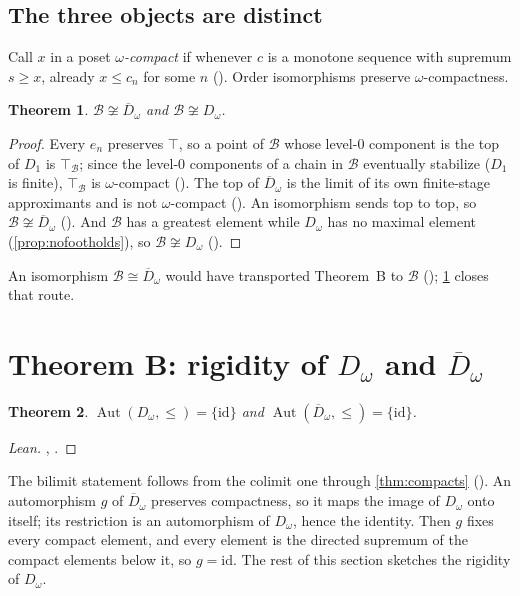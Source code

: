 \documentclass[11pt]{amsart}
\theoremstyle{plain}
\newtheorem{theorem}{Theorem}[section]
\theoremstyle{definition}
\newcommand{\Aut}{\operatorname{Aut}}
\newcommand{\Dc}{D_\omega}
\newcommand{\Db}{\overline{D}_\omega}
\newcommand{\BB}{\mathcal{B}}
\newcommand{\id}{\mathrm{id}}
\newcommand{\iso}{\cong}
\begin{document}
\subsection{The three objects are distinct}

Call $x$ in a poset \emph{$\omega$-compact} if whenever $c$ is a monotone
sequence with supremum $s\ge x$, already $x\le c_n$ for some $n$
(). Order isomorphisms preserve
$\omega$-compactness.

\begin{theorem}\label{thm:gap}
$\BB\not\iso\Db$ and $\BB\not\iso\Dc$.
\end{theorem}

\begin{proof}
Every $e_n$ preserves $\top$, so a point of $\BB$ whose level-$0$ component is
the top of $D_1$ is $\top_\BB$; since the level-$0$ components of a chain in
$\BB$ eventually stabilize ($D_1$ is finite), $\top_\BB$ is $\omega$-compact
(). The top of $\Db$ is the limit of its
own finite-stage approximants and is not $\omega$-compact
(). An isomorphism sends top to top,
so $\BB\not\iso\Db$ (). And $\BB$ has a greatest
element while $\Dc$ has no maximal element (\cref{prop:nofootholds}), so
$\BB\not\iso\Dc$ ().
\end{proof}

An isomorphism $\BB\iso\Db$ would have transported Theorem~B to $\BB$
(); \cref{thm:gap} closes that route.

\section{Theorem B: rigidity of \texorpdfstring{$\Dc$}{D-omega} and \texorpdfstring{$\Db$}{its bilimit}}\label{sec:B}

\begin{theorem}\label{thm:B}
$\Aut(\Dc,\le)=\{\id\}$ and $\Aut(\Db,\le)=\{\id\}$.
\end{theorem}

\begin{proof}[Lean]
, .
\end{proof}

The bilimit statement follows from the colimit one through \cref{thm:compacts}
(). An automorphism
$g$ of $\Db$ preserves compactness, so it maps the image of $\Dc$ onto itself;
its restriction is an automorphism of $\Dc$, hence the identity. Then $g$ fixes
every compact element, and every element is the directed supremum of the compact
elements below it, so $g=\id$. The rest of this section sketches the rigidity of
$\Dc$.
\end{document}
